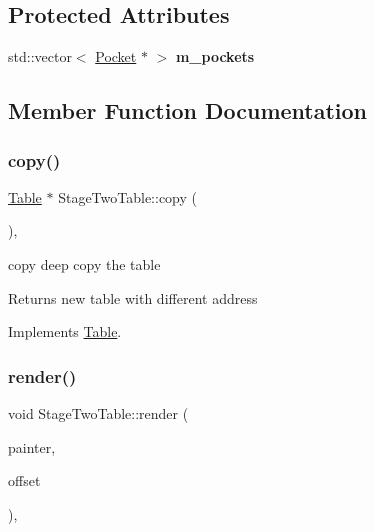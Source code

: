 \subsection*{Protected Attributes}
\begin{DoxyCompactItemize}
\item 
\mbox{\label{class_stage_two_table_aba6026e62b3894b57264b080e6a72b75}} 
std\+::vector$<$ \mbox{\hyperlink{class_pocket}{Pocket}} $\ast$ $>$ {\bfseries m\+\_\+pockets}
\end{DoxyCompactItemize}


\subsection{Member Function Documentation}
\mbox{\label{class_stage_two_table_ab87e388ca2927670b37dffccb91a76b4}} 
\subsubsection{\texorpdfstring{copy()}{copy()}}
{\footnotesize\ttfamily \mbox{\hyperlink{class_table}{Table}} $\ast$ Stage\+Two\+Table\+::copy (\begin{DoxyParamCaption}{ }\end{DoxyParamCaption})\hspace{0.3cm}{\ttfamily [override]}, {\ttfamily [virtual]}}



copy deep copy the table 

\begin{DoxyReturn}{Returns}
new table with different address 
\end{DoxyReturn}


Implements \mbox{\hyperlink{class_table_a881295d0bea9823026471422ec203c6e}{Table}}.

\mbox{\label{class_stage_two_table_ad19f7aa333b65d84b67ce2e55330a669}} 
\subsubsection{\texorpdfstring{render()}{render()}}
{\footnotesize\ttfamily void Stage\+Two\+Table\+::render (\begin{DoxyParamCaption}\item[{Q\+Painter \&}]{painter,  }\item[{const Q\+Vector2D \&}]{offset }\end{DoxyParamCaption})\hspace{0.3cm}{\ttfamily [override]}, {\ttfamily [virtual]}}



